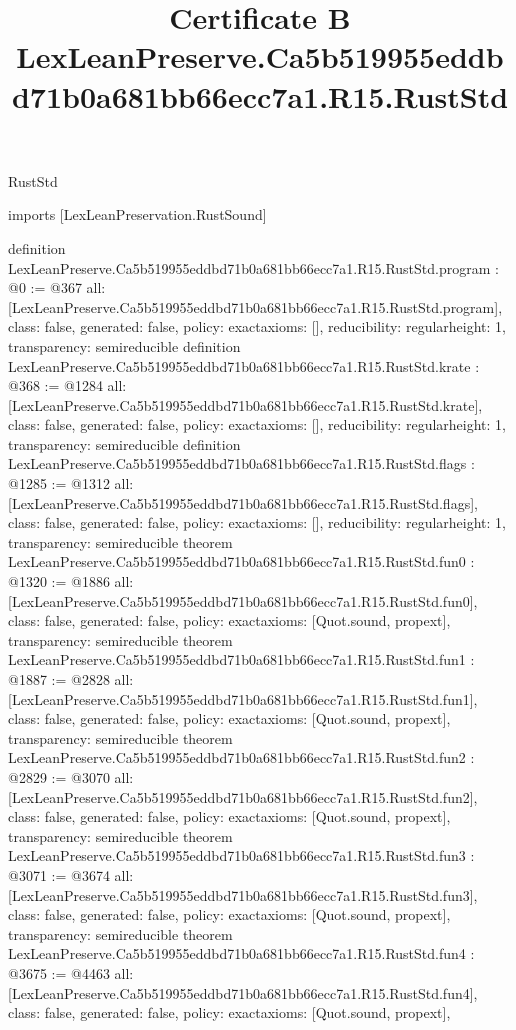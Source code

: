 \begin{lexlean}{RustStd}
\title{Certificate B LexLeanPreserve.Ca5b519955eddbd71b0a681bb66ecc7a1.R15.RustStd}
\begin{coremodule}
imports [LexLeanPreservation.RustSound]

definition LexLeanPreserve.Ca5b519955eddbd71b0a681bb66ecc7a1.R15.RustStd.program : @0 := @367 {
  all: [LexLeanPreserve.Ca5b519955eddbd71b0a681bb66ecc7a1.R15.RustStd.program],
  class: false,
  generated: false,
  policy: exact{axioms: []},
  reducibility: regular{height: 1},
  transparency: semireducible
}
definition LexLeanPreserve.Ca5b519955eddbd71b0a681bb66ecc7a1.R15.RustStd.krate : @368 := @1284 {
  all: [LexLeanPreserve.Ca5b519955eddbd71b0a681bb66ecc7a1.R15.RustStd.krate],
  class: false,
  generated: false,
  policy: exact{axioms: []},
  reducibility: regular{height: 1},
  transparency: semireducible
}
definition LexLeanPreserve.Ca5b519955eddbd71b0a681bb66ecc7a1.R15.RustStd.flags : @1285 := @1312 {
  all: [LexLeanPreserve.Ca5b519955eddbd71b0a681bb66ecc7a1.R15.RustStd.flags],
  class: false,
  generated: false,
  policy: exact{axioms: []},
  reducibility: regular{height: 1},
  transparency: semireducible
}
theorem LexLeanPreserve.Ca5b519955eddbd71b0a681bb66ecc7a1.R15.RustStd.fun0 : @1320 := @1886 {
  all: [LexLeanPreserve.Ca5b519955eddbd71b0a681bb66ecc7a1.R15.RustStd.fun0],
  class: false,
  generated: false,
  policy: exact{axioms: [Quot.sound, propext]},
  transparency: semireducible
}
theorem LexLeanPreserve.Ca5b519955eddbd71b0a681bb66ecc7a1.R15.RustStd.fun1 : @1887 := @2828 {
  all: [LexLeanPreserve.Ca5b519955eddbd71b0a681bb66ecc7a1.R15.RustStd.fun1],
  class: false,
  generated: false,
  policy: exact{axioms: [Quot.sound, propext]},
  transparency: semireducible
}
theorem LexLeanPreserve.Ca5b519955eddbd71b0a681bb66ecc7a1.R15.RustStd.fun2 : @2829 := @3070 {
  all: [LexLeanPreserve.Ca5b519955eddbd71b0a681bb66ecc7a1.R15.RustStd.fun2],
  class: false,
  generated: false,
  policy: exact{axioms: [Quot.sound, propext]},
  transparency: semireducible
}
theorem LexLeanPreserve.Ca5b519955eddbd71b0a681bb66ecc7a1.R15.RustStd.fun3 : @3071 := @3674 {
  all: [LexLeanPreserve.Ca5b519955eddbd71b0a681bb66ecc7a1.R15.RustStd.fun3],
  class: false,
  generated: false,
  policy: exact{axioms: [Quot.sound, propext]},
  transparency: semireducible
}
theorem LexLeanPreserve.Ca5b519955eddbd71b0a681bb66ecc7a1.R15.RustStd.fun4 : @3675 := @4463 {
  all: [LexLeanPreserve.Ca5b519955eddbd71b0a681bb66ecc7a1.R15.RustStd.fun4],
  class: false,
  generated: false,
  policy: exact{axioms: [Quot.sound, propext]},
}
\end{coremodule}
\end{lexlean}
